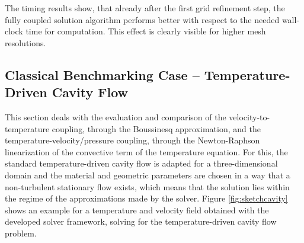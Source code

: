 The timing results show, that already after the first grid refinement step, the fully coupled solution algorithm performs better with respect to the needed wall-clock time for computation. This effect is clearly visible for higher mesh resolutions.

\subsection{Classical Benchmarking Case -- Temperature-Driven Cavity Flow}

This section deals with the evaluation and comparison of the velocity-to-temperature coupling, through the Boussinesq approximation, and the temperature-velocity/pressure coupling, through the Newton-Raphson linearization of the convective term of the temperature equation. For this, the standard temperature-driven cavity flow \cite{christon02,vahl83} is adapted for a three-dimensional domain and the material and geometric parameters are chosen in a way that a non-turbulent stationary flow exists, which means that the solution lies within the regime of the approximations made by the solver. Figure \ref{fig:sketchcavity} shows an example for a temperature and velocity field obtained with the developed solver framework, solving for the temperature-driven cavity flow problem.

